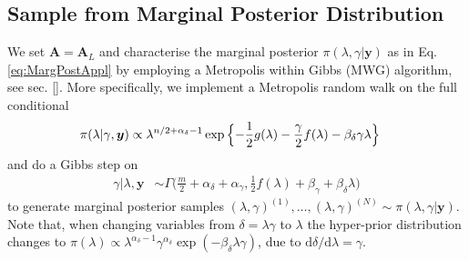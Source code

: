 \subsection{Sample from Marginal Posterior Distribution}
\label{subsec:firstMarg}
We set $\bm{A} = \bm{A}_L$ and characterise the marginal posterior $\pi(\lambda, \gamma | \bm{y})$ as in Eq. \ref{eq:MargPostAppl} by employing a Metropolis within Gibbs (MWG) algorithm, see sec. \ref{}.
More specifically, we implement a Metropolis random walk on the full conditional
\begin{align}
	\label{eq:lamCondPrior}
	\pi(\lambda | \gamma, \bm{y}) &\propto \lambda^{n/2+\alpha_\delta -1} \exp{\Bigl\{ - \frac{1}{2} g ( \lambda) - \frac{\gamma}{2} f ( \lambda) - \beta_\delta \gamma \lambda \Bigr\}} 
\end{align} 
and do a Gibbs step on
\begin{align}
	\gamma |  \lambda, \bm{y} &\sim \Gamma \bigg( \frac{m}{2} + \alpha_\delta + \alpha_\gamma, \frac{1}{2} f (\lambda ) + \beta_\gamma + \beta_\delta \lambda \bigg)\label{eq:GibbsStep}
\end{align} 
to generate marginal posterior samples $(\lambda, \gamma)^{(1)}, \dots, (\lambda, \gamma)^{(N)} \sim  \pi(\lambda, \gamma| \bm{y})$.
Note that, when changing variables from $\delta = \lambda \gamma$ to $\lambda$ the hyper-prior distribution changes to $\pi(\lambda) \propto \lambda^{\alpha_\delta-1} \gamma^{\alpha_\delta} \exp{(- \beta_\delta \lambda  \gamma)} $, due to $\text{d}\delta / \text{d} \lambda = \gamma$.

